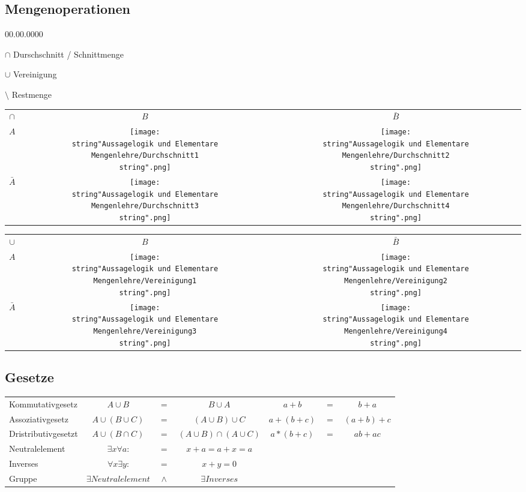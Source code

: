 \subsection*{Mengenoperationen}
\begin{lyxlist}{00.00.0000}
\item [{$\cap$}] Durschschnitt / Schnittmenge
\item [{$\cup$}] Vereinigung
\item [{$\setminus$}] Restmenge
\end{lyxlist}
\begin{tabular}{ccc}
$\cap$ & $B$ & $\bar{B}$\tabularnewline
$A$ & \texttt{[image: \\string"Aussagelogik und Elementare Mengenlehre/Durchschnitt1\\string".png]} & \texttt{[image: \\string"Aussagelogik und Elementare Mengenlehre/Durchschnitt2\\string".png]}\tabularnewline
$\bar{A}$ & \texttt{[image: \\string"Aussagelogik und Elementare Mengenlehre/Durchschnitt3\\string".png]} & \texttt{[image: \\string"Aussagelogik und Elementare Mengenlehre/Durchschnitt4\\string".png]}\tabularnewline
\end{tabular}%
\begin{tabular}{ccc}
$\cup$ & $B$ & $\bar{B}$\tabularnewline
$A$ & \texttt{[image: \\string"Aussagelogik und Elementare Mengenlehre/Vereinigung1\\string".png]} & \texttt{[image: \\string"Aussagelogik und Elementare Mengenlehre/Vereinigung2\\string".png]}\tabularnewline
$\bar{A}$ & \texttt{[image: \\string"Aussagelogik und Elementare Mengenlehre/Vereinigung3\\string".png]} & \texttt{[image: \\string"Aussagelogik und Elementare Mengenlehre/Vereinigung4\\string".png]}\tabularnewline
\end{tabular}


\subsection*{Gesetze}

\begin{tabular}{lccc|ccc}
Kommutativgesetz & $A\cup B$ & $=$ & $B\cup A$ & $a+b$ & $=$ & $b+a$\tabularnewline
Assoziativgesetz & $A\cup(B\cup C)$ & $=$ & $(A\cup B)\cup C$ & $a+(b+c)$ & $=$ & $(a+b)+c$\tabularnewline
Dristributivgesetzt & $A\cup(B\cap C)$ & $=$ & $(A\cup B)\cap(A\cup C)$ & $a*(b+c)$ & $=$ & $ab+ac$\tabularnewline
Neutralelement & $\exists x\forall a$: & $=$ & \multicolumn{1}{c}{$x+a=a+x=a$} &  &  & \tabularnewline
Inverses & $\forall x\exists y$: & $=$ & \multicolumn{1}{c}{$x+y=0$} &  &  & \tabularnewline
Gruppe & $\exists Neutralelement$ & $\wedge$ & \multicolumn{1}{c}{$\exists Inverses$} &  &  & \tabularnewline
\end{tabular}


